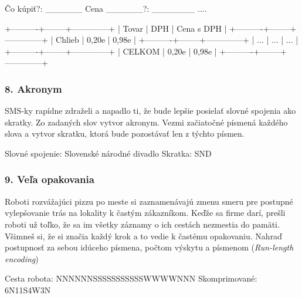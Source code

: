 \begin{code}
Čo kúpiť?: ______
Cena ______?: _______
....

+----------+--------+--------------+
| Tovar    |  DPH   |  Cena s DPH  |
+----------+--------+--------------+
| Chlieb   |  0,20e |      0,98e   |
+----------+--------+--------------+
|    ...   |  ...   |     ...      |
+----------+--------+--------------+
| CELKOM   |  0,20e |      0,98e   |
+----------+--------+--------------+
\end{code}

\subsubsection*{8. Akronym}
SMS-ky rapídne zdraželi a napadlo ti, že bude lepšie posielať slovné spojenia ako skratky. Zo zadaných slov vytvor akronym. Vezmi začiatočné písmená každého slova a vytvor skratku, ktorá bude pozostávať len z týchto písmen.

\begin{code}
Slovné spojenie: Slovenské národné divadlo
Skratka: SND
\end{code}


\subsubsection*{9. Veľa opakovania}
Roboti rozvážajúci pizzu po meste si zaznamenávajú zmenu smeru pre postupné vylepšovanie trás na lokality k častým zákazníkom. Keďže sa firme darí, prešli roboti už toľko, že sa im všetky záznamy o ich cestách nezmestia do pamäti. Všimneš si, že si značia každý krok a to vedie k častému opakovaniu. Nahraď postupnosť za sebou idúceho písmena, počtom výskytu a písmenom (\textit{Run-length encoding})

\begin{code}
Cesta robota: NNNNNNSSSSSSSSSSSWWWWNNN
Skomprimované: 6N11S4W3N
\end{code} 
